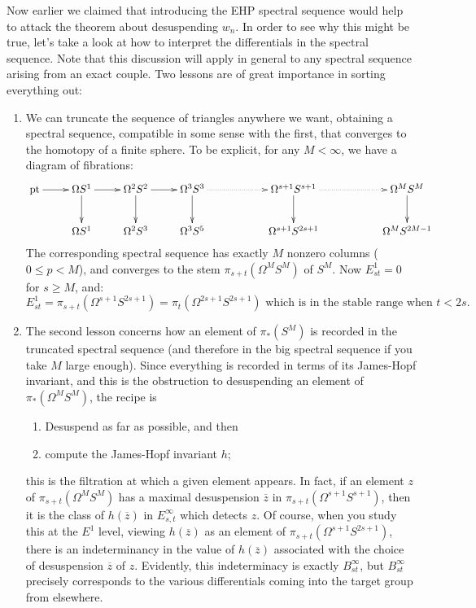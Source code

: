 \documentclass{article}
\newcommand{\ptspace}{\mathrm{pt}}
\newcommand{\Loops}{\Omega}
\theoremstyle{definition}
\begin{document}
Now earlier we claimed that introducing the EHP spectral sequence would help to attack the theorem about desuspending $w_n$.  In order to see why this might be true, let's take a look at how to interpret the differentials in the spectral sequence. Note that this discussion will apply in general to any spectral sequence arising from an exact couple.
Two lessons are of great importance in sorting everything out:
\begin{enumerate}
\item We can truncate the sequence of triangles anywhere we want, obtaining a spectral sequence, compatible in some sense with the first, that converges to the homotopy of a finite sphere. To be explicit, for any $M<\infty$, we have a diagram of fibrations:
\[\xymatrix{
\ptspace\ar[r]&\Omega S^1\ar[d]\ar[r]&\Omega^2 S^2\ar[d]\ar[r]&\Omega^3 S^3\ar[d]\ar@{.>}[rr]&&\Omega^{s+1}S^{s+1}\ar[d]\ar@{.>}[rr]&&\Omega^{M}S^{M}\ar[d]\\
&\Omega S^1&\Omega^2 S^3& \Omega^3S^5&&\Omega^{s+1}S^{2s+1}&&\Omega^{M}S^{2M-1}
}\]
The corresponding spectral sequence has exactly $M$ nonzero columns ($0\leq p <M$), and converges to the stem $\pi_{s+t}(\Omega^{M}S^{M})$ of $S^{M}$. Now $E^1_{st}=0$ for $s\geq M$, and:
\[E_{st}^1=\pi_{s+t}(\Omega^{s+1}S^{2s+1})=\pi_t(\Omega^{2s+1}S^{2s+1})\text{ which is in the stable range when $t< 2s$}.\]

\item The second lesson concerns how an element of $\pi_* (S^M)$ is recorded in the truncated spectral sequence (and therefore in the big spectral sequence if you take $M$ large enough).  Since everything is recorded in terms of its James-Hopf invariant, and this is the obstruction to desuspending an element of $\pi_* (\Loops^M S^M)$, the recipe is
\begin{enumerate}
\item Desuspend as far as possible, and then
\item compute the James-Hopf invariant $h$;
\end{enumerate}
this is the filtration at which a given element appears. In fact, if an element $z$ of $\pi_{s+t}(\Omega^MS^M)$ has a maximal desuspension $\overline z$ in $\pi_{s+t}(\Omega^{s+1}S^{s+1})$, then it is the class of $h(\overline z)$ in $E^{\infty}_{s,t}$ which detects $z$. Of course, when you study this at the $E^1$ level, viewing $h(\overline z)$ as an element of $\pi_{s+t}(\Omega^{s+1}S^{2s+1})$, there is an indeterminancy in the value of $h(\overline z)$ associated with the choice of desuspension $\overline z$ of $z$. Evidently, this indeterminacy is exactly $B_{st}^\infty$, but $B_{st}^\infty$ precisely corresponds to the various differentials coming into the target group from elsewhere.


\end{enumerate}
\end{document}
